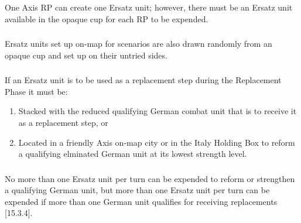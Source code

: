 \subsubsection{}One Axis RP can create one Ersatz unit; however, there must be an Ersatz unit available in the opaque cup for each RP to be expended.

\subsubsection{} Ersatz units set up on-map for scenarios are also drawn randomly from an opaque cup and set up on their untried sides.

\subsubsection{} If an Ersatz unit is to be used as a replacement step during the Replacement Phase it must be:
\begin{enumerate}[label=\alph*.]
    \item Stacked with the reduced qualifying German combat unit that is to receive it as a replacement step, or
    \item Located in a friendly Axis on-map city or in the Italy Holding Box to reform a qualifying elminated German unit at its lowest strength level.
\end{enumerate}

\subsubsection{}No more than one Ersatz unit per turn can be expended to reform or strengthen a qualifying German unit, but more than one Ersatz unit per turn can be expended if more than one German unit qualifies for receiving replacements [15.3.4].